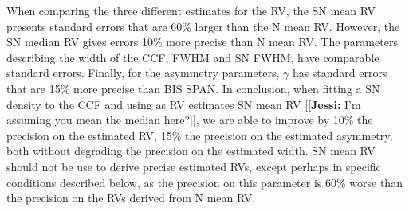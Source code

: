 \documentclass{aa}
\newcommand{\jessi}[1]{{\color{Purple}[[\textbf{Jessi: }#1]]}}
\begin{document}
When comparing the three different estimates for the RV, the SN mean RV presents standard errors that are 60\% larger than the N mean RV. However, the SN median RV gives errors 10\% more precise than N mean RV. 
The parameters describing the width of the CCF, FWHM and SN FWHM, have comparable standard errors. 
Finally, for the asymmetry parameters, $\gamma$ has standard errors that are 15\% more precise than BIS SPAN. 
In conclusion, when fitting a SN density to the CCF and using as RV estimates SN mean RV \jessi{I'm assuming you mean the median here?}, we are able to improve by 10\% the precision on the estimated RV, 15\% the precision on the estimated asymmetry, both without degrading the precision on the estimated width. 
SN mean RV should not be use to derive precise estimated RVs, except perhaps in specific conditions described below, as the precision on this parameter is 60\% worse than the precision on the RVs derived from N mean RV.
%
\end{document}
